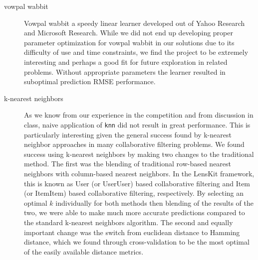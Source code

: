 \documentclass[oneside]{article}
\begin{document}
\begin{description}
    \item[vowpal wabbit] Vowpal wabbit a speedy linear learner developed out of Yahoo Research and Microsoft Research. While we did not end up developing proper parameter optimization for vowpal wabbit in our solutions due to its difficulty of use and time constraints, we find the project to be extremely interesting and perhaps a good fit for future exploration in related problems. Without appropriate parameters the learner resulted in suboptimal prediction RMSE performance. 
    \item[k-nearest neighbors] As we know from our experience in the competition and from discussion in class, naive application of \verb|knn| did not result in great performance. This is particularly interesting given the general success found by k-nearest neighbor approaches in many collaborative filtering problems. We found success using k-nearest neighbors by making two changes to the traditional method. The first was the blending of traditional row-based nearest neighbors with column-based nearest neighbors. In the LensKit framework, this is known as User (or UserUser) based collaborative filtering and Item (or ItemItem) based collaborative filtering, respectively. By selecting an optimal $k$ individually for both methods then blending of the results of the two, we were able to make much more accurate predictions compared to the standard k-nearest neighbors algorithm. The second and equally important change was the switch from euclidean distance to Hamming distance, which we found through cross-validation to be the most optimal of the easily available distance metrics. 


\end{description}
\end{document}
